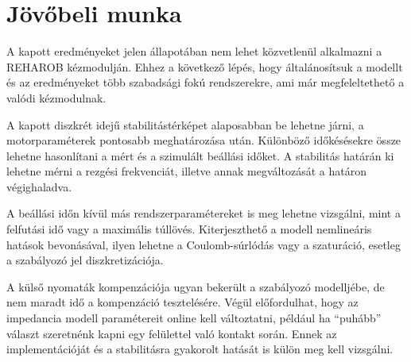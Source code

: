 \chapter{Jövőbeli munka}\label{chap:conclusion}

A kapott eredményeket jelen állapotában nem lehet közvetlenül alkalmazni a REHAROB kézmodulján. 
Ehhez a következő lépés, hogy  általánosítsuk a modellt és az eredményeket több szabadsági fokú rendszerekre, ami már megfeleltethető a valódi kézmodulnak. 

A kapott diszkrét idejű stabilitástérképet alaposabban be lehetne járni, 
a motorparaméterek pontosabb meghatározása után. Különböző időkésésekre össze lehetne hasonlítani 
a mért és a szimulált beállási időket. A stabilitás határán ki lehetne mérni a rezgési frekvenciát, 
illetve annak megváltozását a határon végighaladva. 

A beállási időn kívül más rendszerparamétereket 
is meg lehetne vizsgálni, mint a felfutási idő vagy a maximális túllövés. Kiterjeszthető a modell 
nemlineáris hatások bevonásával, ilyen lehetne a Coulomb-súrlódás vagy a szaturáció, esetleg a 
szabályozó jel diszkretizációja. 

A külső nyomaták kompenzációja ugyan bekerült a 
szabályozó modelljébe, de nem maradt idő a kompenzáció tesztelésére. Végül előfordulhat, 
hogy az impedancia modell paramétereit online kell változtatni, például ha ``puhább'' választ 
szeretnénk kapni egy felülettel való kontakt során. Ennek az implementációját és a stabilitásra 
gyakorolt hatását is külön meg kell vizsgálni.

